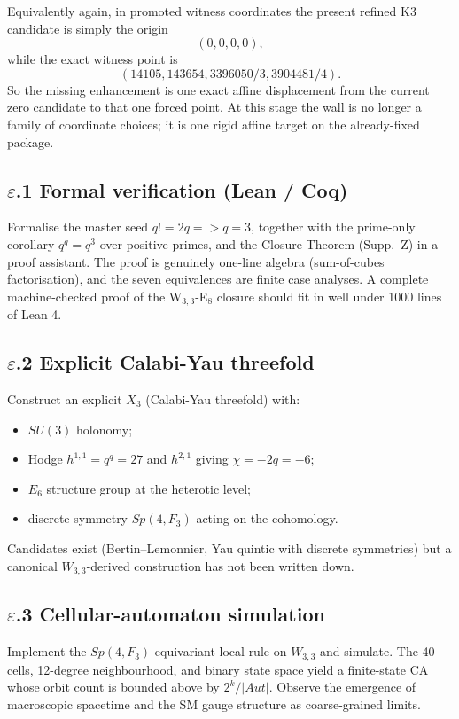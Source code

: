 \documentclass[12pt,a4paper]{article}
\def\mathbb#1{#1}%
\def\mathrm#1{#1}%
\def\Rightarrow{ => }%
\theoremstyle{definition}
\newcommand{\Sp}{\mathrm{Sp}}
\newcommand{\SU}{\mathrm{SU}}
\newcommand{\Aut}{\mathrm{Aut}}
\newcommand{\FF}{\mathbb{F}}
\begin{document}
Equivalently again, in promoted witness coordinates the present refined
K3 candidate is simply the origin
\[
(0,0,0,0),
\]
while the exact witness point is
\[
(14105,143654,3396050/3,3904481/4).
\]
So the missing enhancement is one exact affine displacement from the
current zero candidate to that one forced point.  At this stage the
wall is no longer a family of coordinate choices; it is one rigid
affine target on the already-fixed package.

\subsection*{$\varepsilon$.1 \quad Formal verification (Lean / Coq)}
Formalise the master seed $q!=2q \Rightarrow q=3$, together with the
prime-only corollary $q^q=q^3$ over positive primes, and the Closure
Theorem (Supp.~Z) in a proof assistant. The proof is
genuinely one-line algebra (sum-of-cubes factorisation), and the
seven equivalences are finite case analyses. A complete machine-checked
proof of the W$_{3,3}$-E$_8$ closure should fit in well under 1000
lines of Lean 4.

\subsection*{$\varepsilon$.2 \quad Explicit Calabi-Yau threefold}
Construct an explicit $X_3$ (Calabi-Yau threefold) with:
\begin{itemize}[leftmargin=2em,nosep]
\item $\SU(3)$ holonomy;
\item Hodge $h^{1,1} = q^q = 27$ and $h^{2,1}$ giving $\chi = -2q = -6$;
\item $E_6$ structure group at the heterotic level;
\item discrete symmetry $\Sp(4,\FF_3)$ acting on the cohomology.
\end{itemize}
Candidates exist (Bertin--Lemonnier, Yau quintic with discrete
symmetries) but a canonical $W_{3,3}$-derived construction has not
been written down.

\subsection*{$\varepsilon$.3 \quad Cellular-automaton simulation}
Implement the $\Sp(4,\FF_3)$-equivariant local rule on $W_{3,3}$ and
simulate. The 40 cells, 12-degree neighbourhood, and binary state
space yield a finite-state CA whose orbit count is bounded above by
$2^k/|\Aut|$. Observe the emergence of macroscopic spacetime and the
SM gauge structure as coarse-grained limits.
\end{document}

